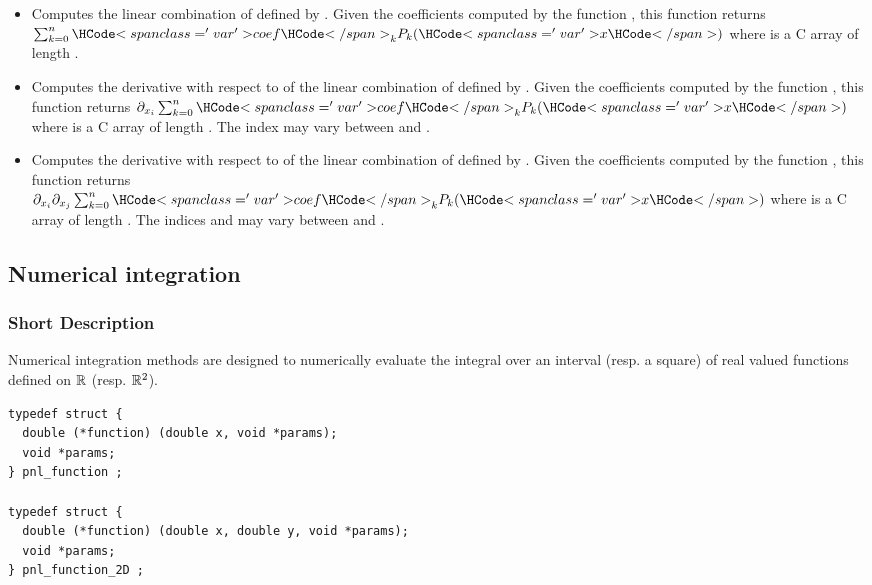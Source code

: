 \begin{itemize}
  \item {}
    \sshortdescribe Computes the linear combination of  defined by
    . Given the coefficients computed by the function
    , this function returns $\sum_{k=0}^n
    \var{coef}_k  P_k(\var{x})$ where  is a C array of length
    .

  \item {}
    \sshortdescribe Computes the derivative with respect to  of the
    linear combination of  defined by . Given the
    coefficients computed by the function , this
    function returns $\partial_{x_i} \sum_{k=0}^n \var{coef}_k  P_k(\var{x})$
    where  is a C array of length . The index 
    may vary between  and .


  \item {}
    \sshortdescribe Computes the derivative with respect to  of the
    linear combination of  defined by . Given the
    coefficients computed by the function , this
    function returns $\partial_{x_i} \partial_{x_j} \sum_{k=0}^n \var{coef}_k  P_k(\var{x})$
    where  is a C array of length . The indices 
    and  may vary between  and .
\end{itemize}


\subsection{Numerical integration}
\subsubsection{Short Description}

Numerical integration methods are designed to numerically evaluate the
integral over an interval (resp. a square) of real valued functions defined on
${\mathbb R}$ (resp. ${\mathbb R}^2$).

\begin{verbatim}
typedef struct {
  double (*function) (double x, void *params);
  void *params;
} pnl_function ;

typedef struct {
  double (*function) (double x, double y, void *params);
  void *params;
} pnl_function_2D ;
\end{verbatim}

